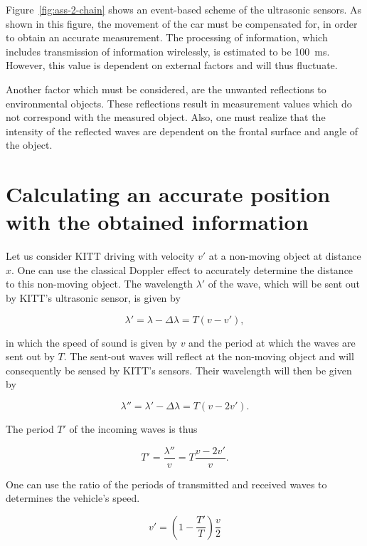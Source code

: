 \documentclass[11pt,titlepage]{report}
\begin{document}
Figure~\ref{fig:ass-2-chain} shows an event-based scheme of the ultrasonic sensors. As shown in this figure, the movement of the car must be compensated for, in order to obtain an accurate measurement. The processing of information, which includes transmission of information wirelessly, is estimated to be \SI{100}{ms}. However, this value is dependent on external factors and will thus fluctuate.

Another factor which must be considered, are the unwanted reflections to environmental objects. These reflections result in measurement values which do not correspond with the measured object. Also, one must realize that the intensity of the reflected waves are dependent on the frontal surface and angle of the object. 

\section{Calculating an accurate position with the obtained information}
Let us consider KITT driving with velocity $v'$ at a non-moving object at distance $x$. One can use the classical Doppler effect to accurately determine the distance to this non-moving object. The wavelength $\lambda'$ of the wave, which will be sent out by KITT's ultrasonic sensor, is given by

\begin{equation}
	\lambda' = \lambda - \Delta \lambda = T (v - v'),
\end{equation}

in which the speed of sound is given by $v$ and the period at which the waves are sent out by $T$. The sent-out waves will reflect at the non-moving object and will consequently be sensed by KITT's sensors. Their wavelength will then be given by

\begin{equation}
	\lambda'' = \lambda' - \Delta \lambda = T (v - 2 v').
\end{equation}

The period $T'$ of the incoming waves is thus

\begin{equation}
	T' = \frac{\lambda''}{v} = T \frac{v - 2 v'}{v}.
\end{equation}

One can use the ratio of the periods of transmitted and received waves to determines the vehicle's speed.

\begin{equation} \label{eq:ass-2-vel-car}
 	v' = \left(1-\frac{T'}{T} \right) \frac{v}{2}
 \end{equation}
\end{document}
